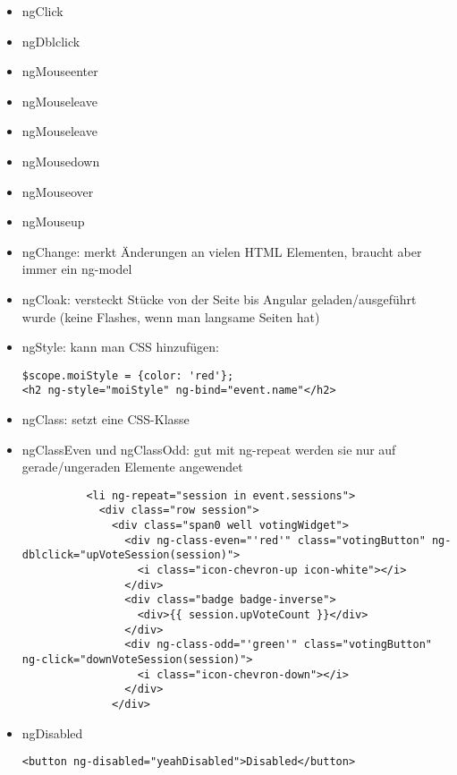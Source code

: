 \begin{itemize}
  \item ngClick
  \item ngDblclick
  \item ngMouseenter
  \item ngMouseleave
  \item ngMouseleave
  \item ngMousedown
  \item ngMouseover
  \item ngMouseup
  \item ngChange: merkt Änderungen an vielen HTML Elementen, braucht aber immer ein ng-model
  \item ngCloak: versteckt Stücke von der Seite bis Angular geladen/ausgeführt wurde (keine Flashes,
    wenn man langsame Seiten hat)
  \item ngStyle: kann man CSS hinzufügen:
    \begin{verbatim}
$scope.moiStyle = {color: 'red'};
<h2 ng-style="moiStyle" ng-bind="event.name"</h2>
    \end{verbatim}
  \item ngClass: setzt eine CSS-Klasse
  \item ngClassEven und ngClassOdd: gut mit ng-repeat werden sie nur auf gerade/ungeraden Elemente angewendet
    \begin{verbatim}
          <li ng-repeat="session in event.sessions">
            <div class="row session">
              <div class="span0 well votingWidget">
                <div ng-class-even="'red'" class="votingButton" ng-dblclick="upVoteSession(session)">
                  <i class="icon-chevron-up icon-white"></i>
                </div>
                <div class="badge badge-inverse">
                  <div>{{ session.upVoteCount }}</div>
                </div>
                <div ng-class-odd="'green'" class="votingButton" ng-click="downVoteSession(session)">
                  <i class="icon-chevron-down"></i>
                </div>
              </div>
    \end{verbatim}
  \item ngDisabled
    \begin{verbatim}
<button ng-disabled="yeahDisabled">Disabled</button>

    \end{verbatim}


\end{itemize}
